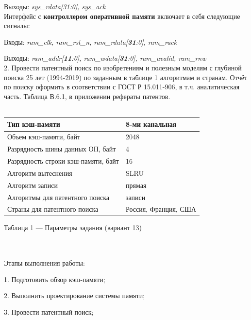 \documentclass[13pt]{article}
\begin{document}
	\hspace{5mm}Выходы: \textit{sys\_rdata[31:0], sys\_ack}\\
	Интерфейс с \textbf{контроллером оперативной памяти} включает в себя следующие сигналы:
	
	\hspace{5mm}Входы: \textit{ram\_clk, ram\_rst\_n, ram\_rdata[\textbf{31}:0], ram\_rack}
	
	\hspace{5mm}Выходы: \textit{ram\_addr[\textbf{11}:0], ram\_wdata[\textbf{31}:0], ram\_avalid, ram\_rnw}\\
	
	2. Провести патентный поиск по изобретениям и полезным моделям с глубиной поиска 25 лет (1994-2019) по заданным в таблице 1 алгоритмам и странам. Отчёт по поиску оформить в соответствии с ГОСТ Р 15.011-906, в т.ч. аналитическая часть. Таблица В.6.1, в приложении рефераты патентов.\\\\
	\begin{tabular}{ | p{200pt} | p{220pt} |}
	\hline
	Тип кэш-памяти & 8-ми канальная \\ \hline
	Объем кэш-памяти, байт & 2048 \\ \hline
    Разрядность шины данных ОП, байт & 4 \\ \hline
	Разрядность строки кэш-памяти, байт & 16 \\ \hline
	Алгоритм вытеснения & SLRU \\ \hline
	Алгоритм записи & прямая \\ \hline
	Алгоритмы для патентного поиска & записи \\ \hline
	Страны для патентного поиска & Россия, Франция, США \\ \hline
    \end{tabular}
    \begin{center}Таблица 1 --- Параметры задания (вариант 13)\end{center} \\\\
    Этапы выполнения работы:
    
    1. Подготовить обзор кэш-памяти;        
    
    2. Выполнить проектирование системы памяти;
    
    3. Провести патентный поиск;
    
\end{document}
